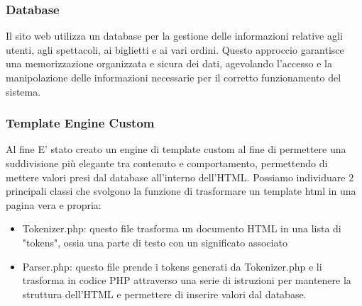 \subsubsection{Database}
Il sito web utilizza un database per la gestione delle informazioni relative agli utenti, agli spettacoli, ai biglietti e ai vari ordini. Questo approccio garantisce una memorizzazione organizzata e sicura dei dati, agevolando l'accesso e la manipolazione delle informazioni necessarie per il corretto funzionamento del sistema.
\\
\begin{minipage}{0.3\textwidth}
     
\end{minipage}

\subsubsection{Template Engine Custom}
Al fine E' stato creato un engine di template custom al fine di permettere una suddivisione più elegante tra contenuto e comportamento, permettendo di mettere valori presi dal database all'interno dell'HTML.
Possiamo individuare 2 principali classi che svolgono la funzione di trasformare un template html in una pagina vera e propria:
\begin{itemize}
    \item Tokenizer.php: questo file trasforma un documento HTML in una lista di "tokens", ossia una parte di testo con un significato associato 
    \item Parser.php: questo file prende i tokens generati da Tokenizer.php e li trasforma in codice PHP attraverso una serie di istruzioni per mantenere la struttura dell'HTML e permettere di inserire valori dal database.
\end{itemize}

